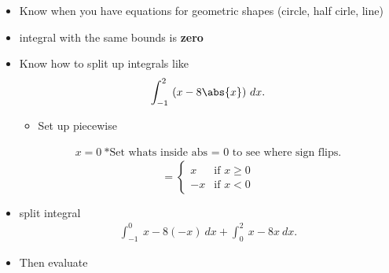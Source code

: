 \documentclass{report}
\begin{document}
\begin{itemize}
\begin{itemize}
          \end{itemize}
        \item Know when you have equations for geometric shapes (circle, half cirle, line)
          \bigbreak \noindent 
        \item integral with the same bounds is \textbf{zero}
        \item Know how to split up integrals like
          \begin{align*}
            \int_{-1}^{2}\ (x-8\abs{x})\ dx
          .\end{align*}
          \begin{itemize}
            \item Set up piecewise
          \end{itemize}
          \begin{align*}
            x= 0\ \text{*Set whats inside abs = 0 to see where sign flips}
          .\end{align*}
               \begin{equation}
                =
                    \begin{cases}
                        x & \text{if } x \geq 0 \\
                        -x & \text{if } x < 0 
                    \end{cases}
                \end{equation}
              \item split integral
                \begin{align*}
                  \int_{-1}^{0}\ x-8(-x)\ dx + \int_{0}^{2}\ x-8x\ dx
                .\end{align*}
              \item Then evaluate
      \end{itemize}

      \bigbreak \noindent \bigbreak \noindent 
\end{document}
